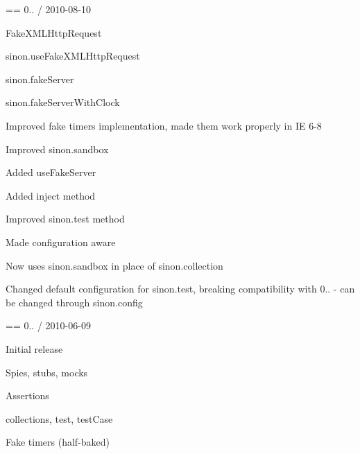 == 0.. / 2010-\/08-\/10
\begin{DoxyItemize}
\item Fake\+X\+M\+L\+Http\+Request
\item sinon.\+use\+Fake\+X\+M\+L\+Http\+Request
\item sinon.\+fake\+Server
\item sinon.\+fake\+Server\+With\+Clock
\item Improved fake timers implementation, made them work properly in IE 6-\/8
\item Improved sinon.\+sandbox
\begin{DoxyItemize}
\item Added use\+Fake\+Server
\item Added inject method
\end{DoxyItemize}
\item Improved sinon.\+test method
\begin{DoxyItemize}
\item Made configuration aware
\item Now uses sinon.\+sandbox in place of sinon.\+collection
\end{DoxyItemize}
\item Changed default configuration for sinon.\+test, breaking compatibility with 0.. -\/ can be changed through sinon.\+config
\end{DoxyItemize}

== 0.. / 2010-\/06-\/09
\begin{DoxyItemize}
\item Initial release
\item Spies, stubs, mocks
\item Assertions
\item collections, test, test\+Case
\item Fake timers (half-\/baked) 
\end{DoxyItemize}